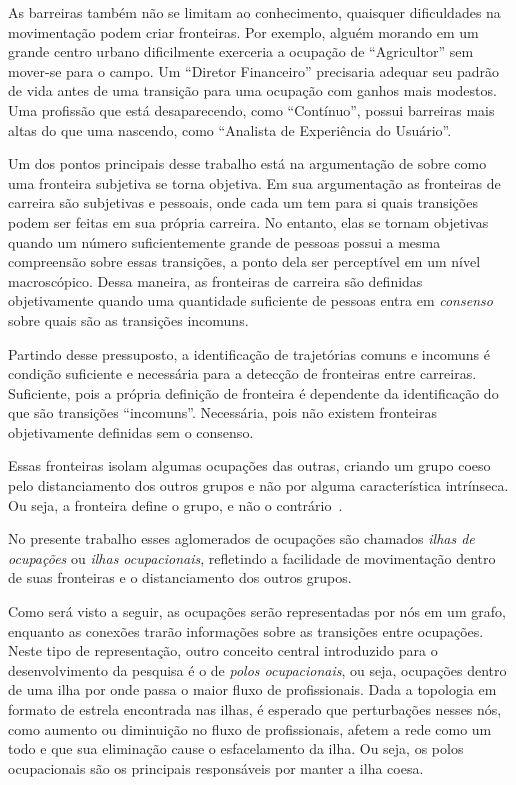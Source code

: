 \documentclass[12pt,a4paper]{article}
\begin{document}
As barreiras também não se limitam ao conhecimento, quaisquer dificuldades na movimentação podem criar fronteiras. Por exemplo, alguém morando em um grande centro urbano dificilmente exerceria a ocupação de \enquote{Agricultor} sem mover-se para o campo. Um \enquote{Diretor Financeiro} precisaria adequar seu padrão de vida antes de uma transição para uma ocupação com ganhos mais modestos. Uma profissão que está desaparecendo, como \enquote{Contínuo}, possui barreiras mais altas do que uma nascendo, como \enquote{Analista de Experiência do Usuário}.

Um dos pontos principais desse trabalho está na argumentação de  sobre como uma fronteira subjetiva se torna objetiva. Em sua argumentação as fronteiras de carreira são subjetivas e pessoais, onde cada um tem para si quais transições podem ser feitas em sua própria carreira. No entanto, elas se tornam objetivas quando um número suficientemente grande de pessoas possui a mesma compreensão sobre essas transições, a ponto dela ser perceptível em um nível macroscópico. Dessa maneira, as fronteiras de carreira são definidas objetivamente quando uma quantidade suficiente de pessoas entra em \textit{consenso} sobre quais são as transições incomuns.

Partindo desse pressuposto, a identificação de trajetórias comuns e incomuns é condição suficiente e necessária para a detecção de fronteiras entre carreiras. Suficiente, pois a própria definição de fronteira é dependente da identificação do que são transições \enquote{incomuns}. Necessária, pois não existem fronteiras objetivamente definidas sem o consenso.

Essas fronteiras isolam algumas ocupações das outras, criando um grupo coeso pelo distanciamento dos outros grupos e não por alguma característica intrínseca.  Ou seja, a fronteira define o grupo, e não o contrário~\cite{Gunz2007-hr,Abbott1995-ft}. 

No presente trabalho esses aglomerados de ocupações são chamados \textit{ilhas de ocupações} ou \textit{ilhas ocupacionais}, refletindo a facilidade de movimentação dentro de suas fronteiras e o distanciamento dos outros grupos.

Como será visto a seguir, as ocupações serão representadas por nós em um grafo, enquanto as conexões trarão informações sobre as transições entre ocupações. Neste tipo de representação, outro conceito central introduzido para o desenvolvimento da pesquisa é o de \textit{polos ocupacionais}, ou seja, ocupações dentro de uma ilha por onde passa o maior fluxo de profissionais. Dada a topologia em formato de estrela encontrada nas ilhas, é esperado que perturbações nesses nós, como aumento ou diminuição no fluxo de profissionais, afetem a rede como um todo e que sua eliminação cause o esfacelamento da ilha. Ou seja, os polos ocupacionais são os principais responsáveis por manter a ilha coesa.
\end{document}
